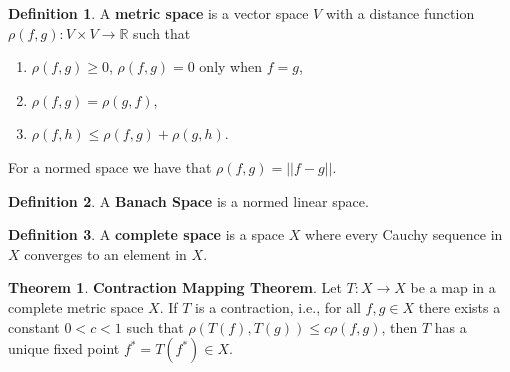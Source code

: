\documentclass[12pt]{article}
\theoremstyle{definition}
\newtheorem*{definition}{Definition}
\newtheorem{theorem}{Theorem}[section]  %
\begin{document}
\begin{definition}
A \textbf{metric space} is a vector space $V$ with a distance function $\rho (f,g): V \times V \rightarrow \mathbb{R}$
such that
\begin{enumerate}
\item $\rho(f,g) \geq 0$, $\rho(f,g) = 0$ only when $f = g$,
\item $\rho(f, g) = \rho(g, f)$,
\item $\rho(f,h) \leq \rho(f,g) + \rho(g,h)$.
\end{enumerate}
\end{definition}

For a normed space we have that $\rho(f,g) = ||f-g||$.

\begin{definition}
A \textbf{Banach Space} is a normed linear space.
\end{definition}

\begin{definition}
A \textbf{complete space} is a space $X$ where every Cauchy sequence in $X$ converges to an element in $X$. 
\end{definition}

\begin{theorem} \textbf{Contraction Mapping Theorem}.
Let $T: X \rightarrow X$ be a map in a complete metric space $X$. If $T$ is a contraction, i.e., for all $f,g \in X$ there exists
a constant $0 < c < 1$ such that $\rho(T(f), T(g)) \leq c \rho(f,g)$, then $T$ has a unique fixed point $f^{*} = T(f^{*}) \in X$.
\end{theorem}
\end{document}
